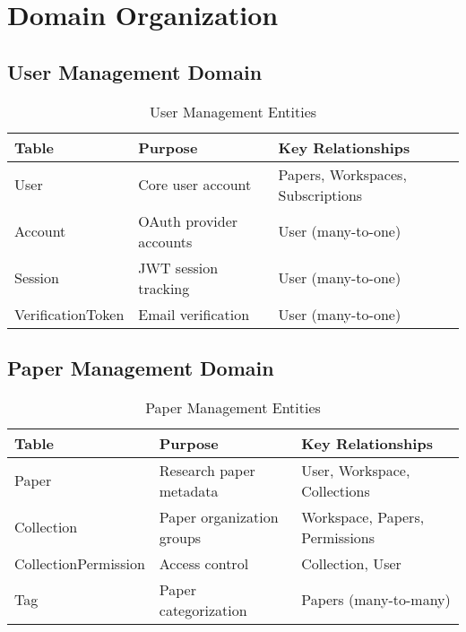 \section{Domain Organization}
\label{sec:erd-domains}

\subsection{User Management Domain}

\begin{table}[H]
\centering
\caption{User Management Entities}
\label{tab:erd-user-domain}
\begin{tabular}{@{}llp{6cm}@{}}
\toprule
\textbf{Table} & \textbf{Purpose} & \textbf{Key Relationships} \\
\midrule
User & Core user account & Papers, Workspaces, Subscriptions \\
Account & OAuth provider accounts & User (many-to-one) \\
Session & JWT session tracking & User (many-to-one) \\
VerificationToken & Email verification & User (many-to-one) \\
\bottomrule
\end{tabular}
\end{table}

\subsection{Paper Management Domain}

\begin{table}[H]
\centering
\caption{Paper Management Entities}
\label{tab:erd-paper-domain}
\begin{tabular}{@{}llp{6cm}@{}}
\toprule
\textbf{Table} & \textbf{Purpose} & \textbf{Key Relationships} \\
\midrule
Paper & Research paper metadata & User, Workspace, Collections \\
Collection & Paper organization groups & Workspace, Papers, Permissions \\
CollectionPermission & Access control & Collection, User \\
Tag & Paper categorization & Papers (many-to-many) \\
\bottomrule
\end{tabular}
\end{table}

